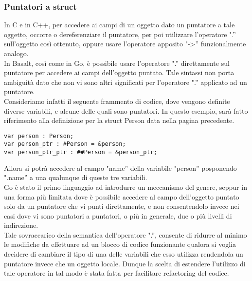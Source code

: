 \subsubsection{Puntatori a struct}
In C e in C++, per accedere ai campi di un oggetto dato un puntatore a tale oggetto, occorre o dereferenziare il 
puntatore, per poi utilizzare l’operatore ".” sull’oggetto così ottenuto, oppure usare l'operatore 
apposito "->” funzionalmente analogo. \\ 

In Basalt, così come in Go, è possibile usare l’operatore ".” direttamente sul puntatore per accedere ai campi 
dell’oggetto puntato. Tale sintassi non porta ambiguità dato che non vi sono altri 
significati per l’operatore ".” applicato ad un puntatore. \\

Consideriamo infatti il seguente frammento di codice, dove vengono definite diverse variabili, e alcune delle 
quali sono puntatori. In questo esempio, sarà fatto riferimento alla 
definizione per la struct Person data nella pagina precedente. \\

\vspace{0.5cm}
\begin{lstlisting}[frame=single]
var person : Person;
var person_ptr : #Person = &person;
var person_ptr_ptr : ##Person = &person_ptr;
\end{lstlisting}
\vspace{0.5cm}
 
Allora si potrà accedere al campo "name” della variabile "person” posponendo 
".name” a una qualunque di queste tre variabili. \\ 

Go è stato il primo linguaggio ad introdurre un meccanismo del genere, seppur in una forma 
più limitata dove è possibile accedere al campo dell’oggetto puntato solo da un 
puntatore che vi punti direttamente, e non consentendolo invece nei casi dove vi 
sono puntatori a puntatori, o più in generale, due o più livelli di indirezione. \\ 

Tale sovraccarico della semantica dell’operatore ".”, consente di ridurre al minimo le 
modifiche da effettuare ad un blocco di codice funzionante qualora si voglia decidere 
di cambiare il tipo di una delle variabili che esso utilizza rendendola un puntatore 
invece che un oggetto locale. Dunque la scelta di estendere l’utilizzo di tale 
operatore in tal modo è stata fatta per facilitare refactoring del codice. \\ 


